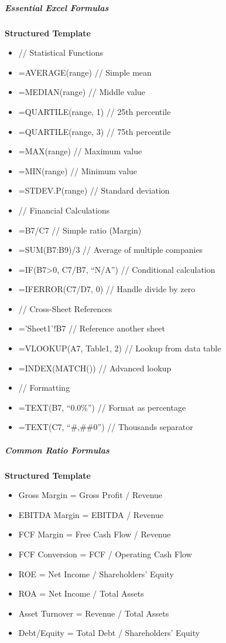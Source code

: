 \documentclass[11pt]{article}
\begin{document}
\subparagraph{Essential Excel Formulas}\mbox{}\par
\textbf{Structured Template}
\begin{itemize}[leftmargin=*,itemsep=2pt,topsep=2pt]
\item {} // Statistical Functions
\item {} =AVERAGE(range) // Simple mean
\item {} =MEDIAN(range) // Middle value
\item {} =QUARTILE(range, 1) // 25th percentile
\item {} =QUARTILE(range, 3) // 75th percentile
\item {} =MAX(range) // Maximum value
\item {} =MIN(range) // Minimum value
\item {} =STDEV.P(range) // Standard deviation
\item {} // Financial Calculations
\item {} =B7/C7 // Simple ratio (Margin)
\item {} =SUM(B7:B9)/3 // Average of multiple companies
\item {} =IF(B7>0, C7/B7, ``N/A'') // Conditional calculation
\item {} =IFERROR(C7/D7, 0) // Handle divide by zero
\item {} // Cross-Sheet References
\item {} ='Sheet1'!B7 // Reference another sheet
\item {} =VLOOKUP(A7, Table1, 2) // Lookup from data table
\item {} =INDEX(MATCH()) // Advanced lookup
\item {} // Formatting
\item {} =TEXT(B7, ``0.0\%'') // Format as percentage
\item {} =TEXT(C7, ``\#,\#\#0'') // Thousands separator
\end{itemize}

\subparagraph{Common Ratio Formulas}\mbox{}\par
\textbf{Structured Template}
\begin{itemize}[leftmargin=*,itemsep=2pt,topsep=2pt]
\item {} Gross Margin = Gross Profit / Revenue
\item {} EBITDA Margin = EBITDA / Revenue
\item {} FCF Margin = Free Cash Flow / Revenue
\item {} FCF Conversion = FCF / Operating Cash Flow
\item {} ROE = Net Income / Shareholders' Equity
\item {} ROA = Net Income / Total Assets
\item {} Asset Turnover = Revenue / Total Assets
\item {} Debt/Equity = Total Debt / Shareholders' Equity
\end{itemize}
\end{document}
